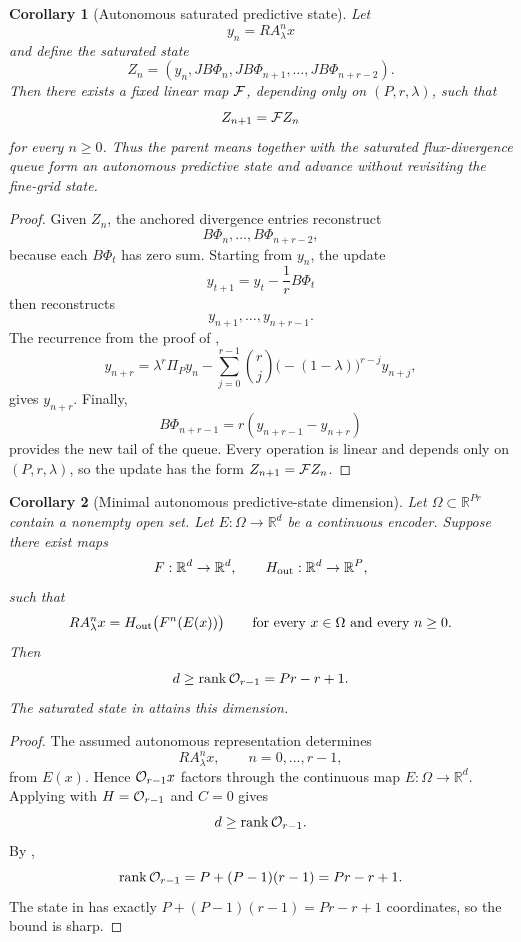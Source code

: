 \documentclass[pdflatex,sn-mathphys-num]{sn-jnl}%
\newtheorem{corollary}{Corollary}
\DeclareMathOperator{\rank}{rank}
\theoremstyle{thmstyleone}%
\theoremstyle{thmstyletwo}%
\theoremstyle{thmstylethree}%
\begin{document}
\begin{corollary}[Autonomous saturated predictive state]
\label{cor:autonomous-state}
Let
\[
  y_n=RA_\lambda^n x
\]
and define the saturated state
\[
  Z_n
  =
  \left(
  y_n,
  JB\Phi_n,
  JB\Phi_{n+1},
  \ldots,
  JB\Phi_{n+r-2}
  \right).
\]
Then there exists a fixed linear map \({\cal F}\), depending only on
\((P,r,\lambda)\), such that
\[
  Z_{n+1}={\cal F}Z_n
\]
for every \(n\ge0\).  Thus the parent means together with the saturated
flux-divergence queue form an autonomous predictive state and advance without
revisiting the fine-grid state.
\end{corollary}

\begin{proof}
Given \(Z_n\), the anchored divergence entries reconstruct
\[
  B\Phi_n,\ldots,B\Phi_{n+r-2},
\]
because each \(B\Phi_t\) has zero sum.  Starting from \(y_n\), the update
\[
  y_{t+1}
  =
  y_t-\frac1r B\Phi_t
\]
then reconstructs
\[
  y_{n+1},\ldots,y_{n+r-1}.
\]
The recurrence from the proof of ,
\[
  y_{n+r}
  =
  \lambda^r \Pi_P y_n
  -
  \sum_{j=0}^{r-1}
  \binom{r}{j}
  \bigl(-(1-\lambda)\bigr)^{r-j}
  y_{n+j},
\]
gives \(y_{n+r}\).  Finally,
\[
  B\Phi_{n+r-1}
  =
  r(y_{n+r-1}-y_{n+r})
\]
provides the new tail of the queue.  Every operation is linear and depends
only on \((P,r,\lambda)\), so the update has the form
\(Z_{n+1}={\cal F}Z_n\).
\end{proof}

\begin{corollary}[Minimal autonomous predictive-state dimension]
\label{cor:minimal-autonomous-dimension}
Let \(\Omega\subset\mathbb R^{Pr}\) contain a nonempty open set.  Let
\(E:\Omega\to\mathbb R^d\) be a continuous encoder.  Suppose there exist maps
\[
  F:\mathbb R^d\to\mathbb R^d,
  \qquad
  H_{\rm out}:\mathbb R^d\to\mathbb R^P,
\]
such that
\[
  RA_\lambda^n x
  =
  H_{\rm out}\bigl(F^n(E(x))\bigr)
  \qquad
  \text{for every }x\in\Omega\text{ and every }n\ge0.
\]
Then
\[
  d\ge \rank{\cal O}_{r-1}
  =
  Pr-r+1.
\]
The saturated state in  attains this dimension.
\end{corollary}

\begin{proof}
The assumed autonomous representation determines
\[
  RA_\lambda^n x,
  \qquad
  n=0,\ldots,r-1,
\]
from \(E(x)\).  Hence \({\cal O}_{r-1}x\) factors through the continuous map
\(E:\Omega\to\mathbb R^d\).  Applying  with
\(H={\cal O}_{r-1}\) and \(C=0\) gives
\[
  d\ge \rank{\cal O}_{r-1}.
\]
By ,
\[
  \rank{\cal O}_{r-1}
  =
  P+(P-1)(r-1)
  =
  Pr-r+1.
\]
The state in  has exactly
\(P+(P-1)(r-1)=Pr-r+1\) coordinates, so the bound is sharp.
\end{proof}
\end{document}
